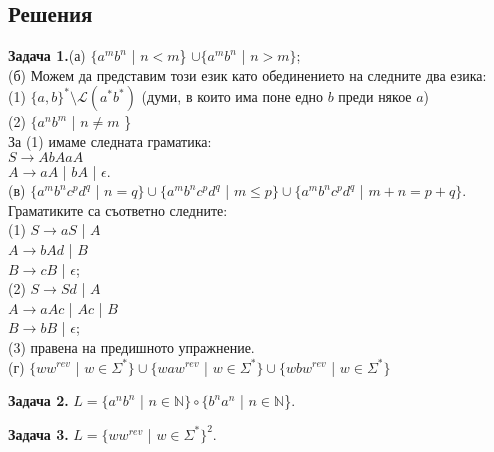 \documentclass[openany]{book}
\begin{document}
\subsection{Решения}
    \textbf{Задача 1.}(а) $\{a^mb^n$ | $n < m$\} $\cup \{a^mb^n$ | $n > m\}$; \\
    (б) Можем да представим този език като обединението на следните два езика: \\
    (1) $\{a,b\}^* \setminus \mathscr{L}(a^*b^*)$ (думи, в които има поне едно $b$ преди някое $a$) \\
    (2) $\{a^nb^m$ | $n \neq m$ \}\\
    За (1) имаме следната граматика: \\
    \vspace{5pt}
    $S \rightarrow AbAaA$ \\
    $A \rightarrow aA$ | $bA$ | $\epsilon$. \\
    \vspace{5pt}
    (в) $\{a^mb^nc^pd^q$ | $n=q\} \cup \{a^mb^nc^pd^q$ | $m\leq p\} \cup \{a^mb^nc^pd^q$ | $m+n = p+q\}$.
    Граматиките са съответно следните: \\
    \vspace{5pt}
    (1) $S \rightarrow aS$ | $A$ \\
    $A \rightarrow bAd$ | $B$ \\
    $B \rightarrow cB$ | $\epsilon$; \\
    \vspace{5pt}
    (2) $S \rightarrow Sd$ | $A$ \\
    $A \rightarrow aAc$ | $Ac$ | $B$ \\
    $B \rightarrow bB$ | $\epsilon$; \\
    \vspace{5pt}
    (3) правена на предишното упражнение. \\
    (г) $\{ww^{rev}$ | $w \in \Sigma^*\} \cup \{waw^{rev}$ | $w \in \Sigma^*\} \cup \{wbw^{rev}$ | $w \in \Sigma^*\}$

    \vspace{15pt}

    \textbf{Задача 2.} $L = \{a^nb^n$ | $n \in \mathbb{N}\} \circ \{b^na^n$ | $n \in \mathbb{N}$\}.

    \vspace{15pt}

    \textbf{Задача 3.} $L = \{ww^{rev}$ | $w \in \Sigma^*\}^2$. 

    \vspace{15pt}
\end{document}
